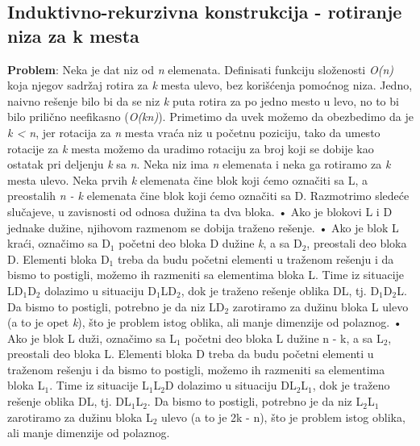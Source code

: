 \documentclass{article}
\begin{document}
\subsection{Induktivno-rekurzivna konstrukcija - rotiranje niza za k mesta}
\textbf{Problem}: Neka je dat niz od \textit{n} elemenata. Definisati funkciju složenosti \textit{O(n)}
koja njegov sadržaj rotira za \textit{k} mesta ulevo, bez korišćenja pomoćnog niza.
\newline Jedno, naivno rešenje bilo bi da se niz \textit{k} puta rotira za po jedno mesto u levo,
no to bi bilo prilično neefikasno (\textit{O(kn)}). 
\newline Primetimo da uvek možemo da obezbedimo da
je \textit{k < n}, jer rotacija za \textit{n} mesta vraća niz u početnu poziciju, tako da umesto rotacije za \textit{k} mesta možemo da uradimo rotaciju za broj koji se dobije kao ostatak
pri deljenju \textit{k} sa \textit{n}.
\newline Neka niz ima \textit{n} elemenata i neka ga rotiramo za \textit{k} mesta ulevo. Neka
prvih \textit{k} elemenata čine blok koji ćemo označiti sa L, a preostalih \textit{n - k} elemenata
čine blok koji ćemo označiti sa D. Razmotrimo sledeće slučajeve, u zavisnosti
od odnosa dužina ta dva bloka.
\newline \hspace*{0.2cm}• Ako je blokovi L i D jednake dužine, njihovom razmenom se dobija traženo rešenje.
\newline \hspace*{0.2cm}• Ako je blok L kraći, označimo sa D$_1$ početni deo bloka D dužine \textit{k}, a
sa D$_2$, preostali deo bloka D. Elementi bloka D$_1$ treba da budu početni
elementi u traženom rešenju i da bismo to postigli, možemo ih razmeniti
sa elementima bloka L. Time iz situacije LD$_1$D$_2$ dolazimo u situaciju
D$_1$LD$_2$, dok je traženo rešenje oblika DL, tj. D$_1$D$_2$L. Da bismo to postigli,
potrebno je da niz LD$_2$ zarotiramo za dužinu bloka L ulevo (a to je opet
\textit{k}), što je problem istog oblika, ali manje dimenzije od polaznog.
\newline \hspace*{0.2cm}• Ako je blok L duži, označimo sa L$_1$ početni deo bloka L dužine n - k, a
sa L$_2$, preostali deo bloka L. Elementi bloka D treba da budu početni
elementi u traženom rešenju i da bismo to postigli, možemo ih razmeniti
sa elementima bloka L$_1$. Time iz situacije L$_1$L$_2$D dolazimo u situaciju
DL$_2$L$_1$, dok je traženo rešenje oblika DL, tj. DL$_1$L$_2$. Da bismo to postigli,
potrebno je da niz L$_2$L$_1$ zarotiramo za dužinu bloka L$_2$ ulevo (a to je 2k - n), što je problem istog oblika, ali manje dimenzije od polaznog.
\end{document}
